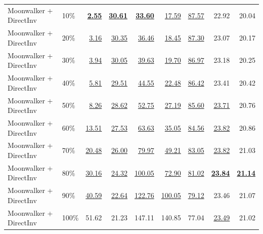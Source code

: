 \documentclass[10pt]{article}
\begin{document}
\begin{table}[htbp]
{\begin{tabular}{llrrrrrrr}
Moonwalker + DirectInv & 10\% & \underline{\textbf{2.55}} & \underline{\textbf{30.61}} & \underline{\textbf{33.60}} & \underline{17.59} & \underline{87.57} & 22.92 & 20.04 \\
Moonwalker + DirectInv & 20\% & \underline{3.16} & \underline{30.35} & \underline{36.46} & \underline{18.45} & \underline{87.30} & 23.07 & 20.17 \\
Moonwalker + DirectInv & 30\% & \underline{3.94} & \underline{30.05} & \underline{39.63} & \underline{19.70} & \underline{86.97} & 23.18 & 20.25 \\
Moonwalker + DirectInv & 40\% & \underline{5.81} & \underline{29.51} & \underline{44.55} & \underline{22.48} & \underline{86.42} & 23.41 & 20.42 \\
Moonwalker + DirectInv & 50\% & \underline{8.26} & \underline{28.62} & \underline{52.75} & \underline{27.19} & \underline{85.60} & \underline{23.71} & 20.76 \\
Moonwalker + DirectInv & 60\% & \underline{13.51} & \underline{27.53} & \underline{63.63} & \underline{35.05} & \underline{84.56} & \underline{23.82} & 20.86 \\
Moonwalker + DirectInv & 70\% & \underline{20.48} & \underline{26.00} & \underline{79.97} & \underline{49.21} & \underline{83.05} & \underline{23.82} & 21.03 \\
Moonwalker + DirectInv & 80\% & \underline{30.16} & \underline{24.32} & \underline{100.05} & \underline{72.90} & \underline{81.02} & \underline{\textbf{23.84}} & \underline{\textbf{21.14}} \\
Moonwalker + DirectInv & 90\% & \underline{40.59} & \underline{22.64} & \underline{122.76} & \underline{100.05} & \underline{79.12} & 23.46 & 21.07 \\
Moonwalker + DirectInv & 100\% & 51.62 & 21.23 & 147.11 & 140.85 & 77.04 & \underline{23.49} & 21.02 \\
\bottomrule
\end{tabular}}
\end{table}
\end{document}

